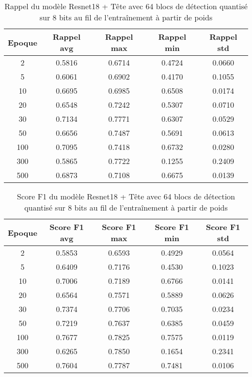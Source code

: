 \begin{table}[!ht]
    \caption{Rappel du modèle Resnet18 + Tête avec 64 blocs de détection quantisé sur 8 bits au fil de l'entraînement à partir de poids}
    \label{tab:qresnet18+head_64n_rappel_8b_from_weights}
    \centering
    \begin{tabular}{ |c||c|c|c|c|  }
        \hline
        \rowcolor{gray!50}
        Epoque & Rappel avg & Rappel max & Rappel min & Rappel std\\
        \hline
        2 & 0.5816 & 0.6714 & 0.4724 & 0.0660\\
        5 & 0.6061 & 0.6902 & 0.4170 & 0.1055\\
        10 & 0.6695 & 0.6985 & 0.6508 & 0.0174\\
        20 & 0.6548 & 0.7242 & 0.5307 & 0.0710\\
        30 & 0.7134 & 0.7771 & 0.6307 & 0.0529\\
        50 & 0.6656 & 0.7487 & 0.5691 & 0.0613\\
        100 & 0.7095 & 0.7418 & 0.6732 & 0.0280\\
        300 & 0.5865 & 0.7722 & 0.1255 & 0.2409\\
        500 & 0.6873 & 0.7108 & 0.6675 & 0.0139\\
        \hline
    \end{tabular}
\end{table}

\begin{table}[!ht]
    \caption{Score F1 du modèle Resnet18 + Tête avec 64 blocs de détection quantisé sur 8 bits au fil de l'entraînement à partir de poids}
    \label{tab:qresnet18+head_64n_f1score_8b_from_weights}
    \centering
    \begin{tabular}{ |c||c|c|c|c|  }
        \hline
        \rowcolor{gray!50}
        Epoque & Score F1 avg & Score F1 max & Score F1 min & Score F1 std\\
        \hline
        2 & 0.5853 & 0.6593 & 0.4929 & 0.0564\\
        5 & 0.6409 & 0.7176 & 0.4530 & 0.1023\\
        10 & 0.7006 & 0.7189 & 0.6766 & 0.0141\\
        20 & 0.6564 & 0.7571 & 0.5889 & 0.0626\\
        30 & 0.7374 & 0.7706 & 0.7035 & 0.0234\\
        50 & 0.7219 & 0.7637 & 0.6385 & 0.0459\\
        100 & 0.7677 & 0.7825 & 0.7575 & 0.0119\\
        300 & 0.6265 & 0.7850 & 0.1654 & 0.2341\\
        500 & 0.7604 & 0.7787 & 0.7481 & 0.0106\\
        \hline
    \end{tabular}
\end{table}


